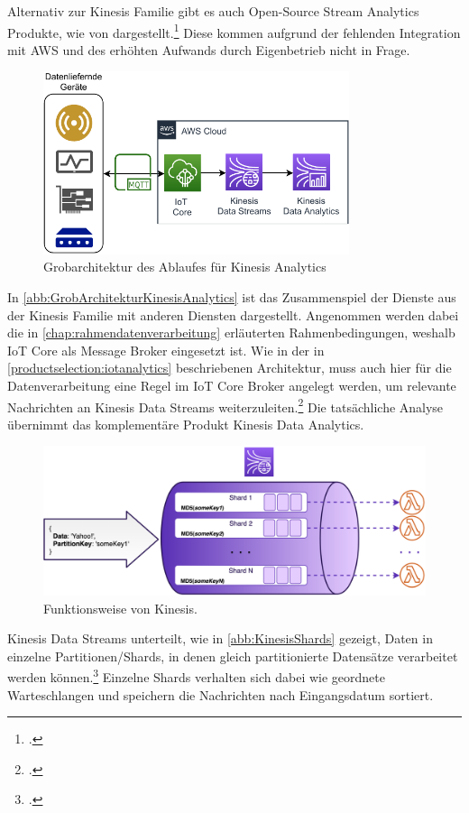 Alternativ zur Kinesis Familie gibt es auch Open-Source Stream Analytics Produkte, wie von \citeauthor{Singh.2016} dargestellt.\footcite[Vgl.][]{Singh.2016} Diese kommen aufgrund der fehlenden Integration mit \ac{AWS} und des erhöhten Aufwands durch Eigenbetrieb nicht in Frage.

\begin{figure}[H]
\centering
\includegraphics[width=0.8\textwidth]{graphics/Kinesis-Analytics-general.pdf}
\caption{Grobarchitektur des Ablaufes für Kinesis Analytics}
\label{abb:GrobArchitekturKinesisAnalytics}
\end{figure}
In \autoref{abb:GrobArchitekturKinesisAnalytics} ist das Zusammenspiel der Dienste aus der Kinesis Familie mit anderen Diensten dargestellt. Angenommen werden dabei die in \autoref{chap:rahmendatenverarbeitung} erläuterten Rahmenbedingungen, weshalb \ac{IoT} Core als Message Broker eingesetzt ist. Wie in der in \autoref{productselection:iotanalytics} beschriebenen Architektur, muss auch hier für die Datenverarbeitung eine Regel im \ac{IoT} Core Broker angelegt werden, um relevante Nachrichten an Kinesis Data Streams weiterzuleiten.\footcite[Vgl.][]{AmazonWebServicesInc..o.J.} Die tatsächliche Analyse übernimmt das komplementäre Produkt Kinesis Data Analytics.

\begin{figure}[H]
\centering
\includegraphics[width=\textwidth]{graphics/kinesis-inner-workings.png}
\caption[Funktionsweise von Kinesis]{Funktionsweise von Kinesis.\footnotemark}
\label{abb:KinesisShards}
\end{figure}
Kinesis Data Streams unterteilt, wie in \autoref{abb:KinesisShards} gezeigt, Daten in einzelne Partitionen/Shards, in denen gleich partitionierte Datensätze verarbeitet werden können.\footcite[Vgl. auch im Folgenden][]{Pogosova.28.05.2020} Einzelne Shards verhalten sich dabei wie geordnete Warteschlangen und speichern die Nachrichten nach Eingangsdatum sortiert. 

